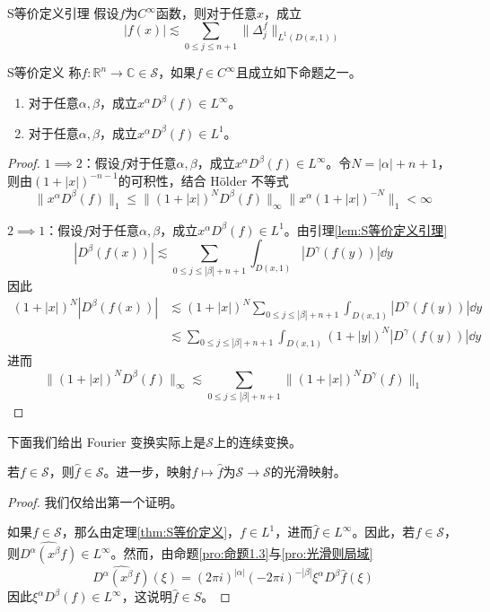 \documentclass[lang = cn, %
scheme = chinese          %
]
{elegantbook}             %
\newcommand{\R}{\mathbb{R}}            %
\newcommand{\C}{\mathbb{C}}  		   %
\begin{document}
\begin{lemma}{}{S等价定义引理}
	假设$f$为$C^\infty$函数，则对于任意$x$，成立
	\[
	|f(x)| \lesssim \sum_{0\le j \le n+1}\|\Delta_j^f\|_{L^1(D(x,1))}
	\]
\end{lemma}

\begin{theorem}{}{S等价定义}
	称$f:\R^n\to\C\in\mathcal{S}$，如果$f\in C^\infty$且成立如下命题之一。
	\begin{enumerate}
		\item 对于任意$\alpha,\beta$，成立$x^\alpha D^\beta(f)\in L^\infty$。
		\item 对于任意$\alpha,\beta$，成立$x^\alpha D^\beta(f)\in L^1$。
	\end{enumerate}
\end{theorem}

\begin{proof}
	$1\implies 2$：假设$f$对于任意$\alpha,\beta$，成立$x^\alpha D^\beta(f)\in L^\infty$。令$N=|\alpha|+n+1$，则由$(1+|x|)^{-n-1}$的可积性，结合 Hölder 不等式
	\[
	\|x^\alpha D^\beta(f) \|_1
	\le \|(1+|x|)^ND^\beta(f) \|_\infty
	\|x^\alpha(1+|x|)^{-N} \|_1
	<\infty
	\]
	
	$2\implies 1$：假设$f$对于任意$\alpha,\beta$，成立$x^\alpha D^\beta(f)\in L^1$。由引理\ref{lem:S等价定义引理}
	\[
	|D^\beta(f(x))| \lesssim \sum_{0\le j \le |\beta|+n+1}\int_{D(x,1)}|D^\gamma(f(y))|\dd y
	\]
	因此
	\begin{align*}
		(1+|x|)^N|D^\beta(f(x))|
		& \lesssim (1+|x|)^N\sum_{0\le j \le |\beta|+n+1}\int_{D(x,1)}|D^\gamma(f(y))|\dd y \\
		& \lesssim \sum_{0\le j \le |\beta|+n+1}\int_{D(x,1)}(1+|y|)^N|D^\gamma(f(y))|\dd y
	\end{align*}
	进而
	\[
	\|(1+|x|)^ND^\beta(f)\|_\infty
	\lesssim \sum_{0\le j \le |\beta|+n+1}\|(1+|x|)^ND^\gamma(f)\|_1
	\]
\end{proof}

下面我们给出 Fourier 变换实际上是$\mathcal{S}$上的连续变换。

\begin{theorem}
	若$f\in\mathcal{S}$，则$\widehat{f}\in\mathcal{S}$。进一步，映射$f\mapsto \widehat{f}$为$\mathcal{S}\to\mathcal{S}$的光滑映射。
\end{theorem}

\begin{proof}
	我们仅给出第一个证明。
	
	如果$f\in\mathcal{S}$，那么由定理\ref{thm:S等价定义}，$f\in L^1$，进而$\widehat{f}\in L^\infty$。因此，若$f\in\mathcal{S}$，则$\widehat{D^\alpha (x^\beta f)}\in L^\infty$。然而，由命题\ref{pro:命题1.3}与\ref{pro:光滑则局域}
	\[
	\widehat{D^\alpha (x^\beta f)}(\xi)
	=(2\pi i)^{|\alpha|}(-2\pi i)^{-|\beta|}\xi^\alpha D^\beta\widehat{f}(\xi)
	\]
	因此$\xi^\alpha D^\beta(f)\in L^\infty$，这说明$\widehat{f}\in S$。
\end{proof}
\end{document}
